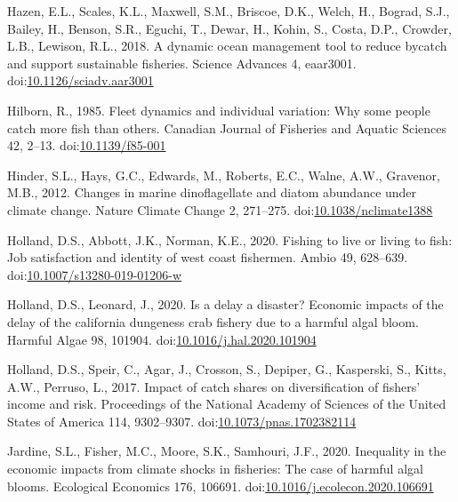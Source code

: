 \documentclass[]{elsarticle} %
\begin{document}
\leavevmode\hypertarget{ref-Kohin2018}{}%
Hazen, E.L., Scales, K.L., Maxwell, S.M., Briscoe, D.K., Welch, H.,
Bograd, S.J., Bailey, H., Benson, S.R., Eguchi, T., Dewar, H., Kohin,
S., Costa, D.P., Crowder, L.B., Lewison, R.L., 2018. A dynamic ocean
management tool to reduce bycatch and support sustainable fisheries.
Science Advances 4, eaar3001.
doi:\href{https://doi.org/10.1126/sciadv.aar3001}{10.1126/sciadv.aar3001}

\leavevmode\hypertarget{ref-Hilborn1985}{}%
Hilborn, R., 1985. Fleet dynamics and individual variation: Why some
people catch more fish than others. Canadian Journal of Fisheries and
Aquatic Sciences 42, 2--13.
doi:\href{https://doi.org/10.1139/f85-001}{10.1139/f85-001}

\leavevmode\hypertarget{ref-Hinder2012}{}%
Hinder, S.L., Hays, G.C., Edwards, M., Roberts, E.C., Walne, A.W.,
Gravenor, M.B., 2012. Changes in marine dinoflagellate and diatom
abundance under climate change. Nature Climate Change 2, 271--275.
doi:\href{https://doi.org/10.1038/nclimate1388}{10.1038/nclimate1388}

\leavevmode\hypertarget{ref-Holland2020}{}%
Holland, D.S., Abbott, J.K., Norman, K.E., 2020. Fishing to live or
living to fish: Job satisfaction and identity of west coast fishermen.
Ambio 49, 628--639.
doi:\href{https://doi.org/10.1007/s13280-019-01206-w}{10.1007/s13280-019-01206-w}

\leavevmode\hypertarget{ref-Holland2020a}{}%
Holland, D.S., Leonard, J., 2020. Is a delay a disaster? Economic
impacts of the delay of the california dungeness crab fishery due to a
harmful algal bloom. Harmful Algae 98, 101904.
doi:\href{https://doi.org/10.1016/j.hal.2020.101904}{10.1016/j.hal.2020.101904}

\leavevmode\hypertarget{ref-Holland2017}{}%
Holland, D.S., Speir, C., Agar, J., Crosson, S., Depiper, G., Kasperski,
S., Kitts, A.W., Perruso, L., 2017. Impact of catch shares on
diversification of fishers' income and risk. Proceedings of the National
Academy of Sciences of the United States of America 114, 9302--9307.
doi:\href{https://doi.org/10.1073/pnas.1702382114}{10.1073/pnas.1702382114}

\leavevmode\hypertarget{ref-Jardine2020}{}%
Jardine, S.L., Fisher, M.C., Moore, S.K., Samhouri, J.F., 2020.
Inequality in the economic impacts from climate shocks in fisheries: The
case of harmful algal blooms. Ecological Economics 176, 106691.
doi:\href{https://doi.org/10.1016/j.ecolecon.2020.106691}{10.1016/j.ecolecon.2020.106691}
\end{document}
